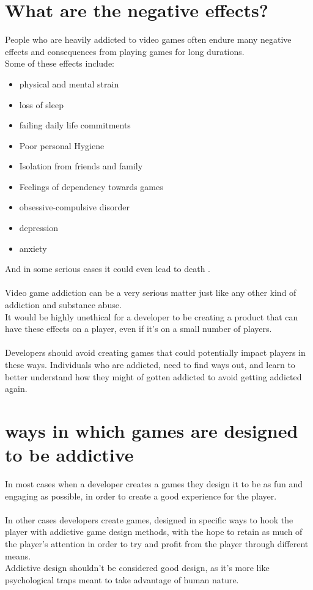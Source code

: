 \documentclass{scrartcl}
\begin{document}
\section{What are the negative effects?}
People who are heavily addicted to video games often endure many negative effects and consequences from playing games for long durations.\cite{Addiction3}
\\
Some of these effects include:
\begin{itemize}
  \item physical and mental strain
  \item loss of sleep
  \item failing daily life commitments
  \item Poor personal Hygiene
  \item Isolation from friends and family
  \item Feelings of dependency towards games
  \item obsessive-compulsive disorder
  \item depression
  \item anxiety
\end{itemize}
And in some serious cases it could even lead to death \cite{parkin2015death}.
\\
\\
Video game addiction can be a very serious matter just like any other kind of addiction and substance abuse.\cite{Addiction1, Addiction2, Addiction3}
\\
It would be highly unethical for a developer to be creating a product that can have these effects on a player, even if it's on a small number of players.
\\
\\
Developers should avoid creating games that could potentially impact players in these ways.\cite{Ethics1} Individuals who are addicted, need to find ways out, and learn to better understand how they might of gotten addicted to avoid getting addicted again.

\section{ways in which games are designed to be addictive}
In most cases when a developer creates a games they design it to be as fun and engaging as possible, in order to create a good experience for the player.
\\
\\
In other cases developers create games, designed in specific ways to hook the player with addictive game design methods, with the hope to retain as much of the player's attention in order to try and profit from the player through different means.\cite{AddictiveDesign1, AddictiveDesign2}
\\
Addictive design shouldn't be considered good design, as it's more like psychological traps meant to take advantage of human nature.
\end{document}
